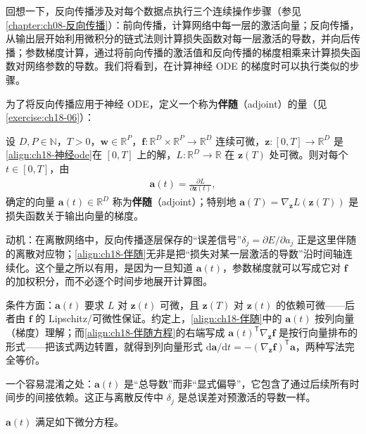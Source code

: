 \documentclass[../../main.tex]{subfiles}
\begin{document}
回想一下，反向传播涉及对每个数据点执行三个连续操作步骤（参见\cref{chapter:ch08-反向传播}）：前向传播，计算网络中每一层的激活向量；反向传播，从输出层开始利用微积分的链式法则计算损失函数对每一层激活的导数，并向后传播；参数梯度计算，通过将前向传播的激活值和反向传播的梯度相乘来计算损失函数对网络参数的导数。我们将看到，在计算神经 ODE 的梯度时可以执行类似的步骤。

为了将反向传播应用于神经 ODE，定义一个称为\textbf{伴随}（adjoint）的量（见\cref{exercise:ch18-06}）：

\begin{definition}[伴随状态]\label{definition:ch18-伴随}
设 $D,P\in\mathbb{N}$，$T>0$，$\bm{w}\in\mathbb{R}^{P}$，$\bm{f}:\mathbb{R}^{D}\times\mathbb{R}^{P}\to\mathbb{R}^{D}$ 连续可微，$\bm{z}:[0,T]\to\mathbb{R}^{D}$ 是\eqref{align:ch18-神经ode}在 $[0,T]$ 上的解，$L:\mathbb{R}^{D}\to\mathbb{R}$ 在 $\bm{z}(T)$ 处可微。则对每个 $t\in[0,T]$，由
\begin{align}
  \bm{a}(t)=\frac{\partial L}{\partial\bm{z}(t)},\label{align:ch18-伴随}
\end{align}
确定的向量 $\bm{a}(t)\in\mathbb{R}^{D}$ 称为\textbf{伴随}（adjoint）；特别地 $\bm{a}(T)=\nabla_{\bm{z}}L(\bm{z}(T))$ 是损失函数关于输出向量的梯度。
\end{definition}

\begin{remark}
动机：在离散网络中，反向传播逐层保存的“误差信号”$\delta_j=\partial E/\partial a_j$ 正是这里伴随的离散对应物；\eqref{align:ch18-伴随}无非是把“损失对某一层激活的导数”沿时间轴连续化。这个量之所以有用，是因为一旦知道 $\bm{a}(t)$，参数梯度就可以写成它对 $\bm{f}$ 的加权积分，而不必逐个时间步地展开计算图。

条件方面：$\bm{a}(t)$ 要求 $L$ 对 $\bm{z}(t)$ 可微，且 $\bm{z}(T)$ 对 $\bm{z}(t)$ 的依赖可微——后者由 $\bm{f}$ 的 Lipschitz/可微性保证。约定上，\eqref{align:ch18-伴随}中的 $\bm{a}(t)$ 按列向量（梯度）理解；而\eqref{align:ch18-伴随方程}的右端写成 $\bm{a}(t)^{\mathsf T}\nabla_{\bm{z}}\bm{f}$ 是按行向量排布的形式——把该式两边转置，就得到列向量形式 $\mathrm{d}\bm{a}/\mathrm{d}t=-(\nabla_{\bm{z}}\bm{f})^{\mathsf T}\bm{a}$，两种写法完全等价。

一个容易混淆之处：$\bm{a}(t)$ 是“总导数”而非“显式偏导”，它包含了通过后续所有时间步的间接依赖。这正与离散反传中 $\delta_j$ 是总误差对预激活的导数一样。
\end{remark}

$\bm{a}(t)$ 满足如下微分方程。
\end{document}
